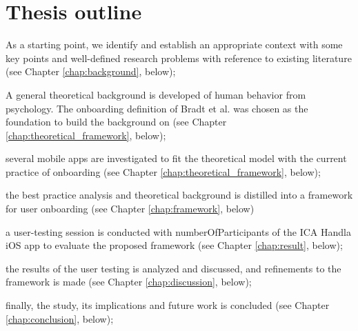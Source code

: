 \section{Thesis outline}
\begin{enumerate*}[label=(\(\arabic*\))]
  \item As a starting point, we identify and establish an appropriate context with some key points and well-defined research problems with reference to existing literature (see Chapter \ref{chap:background}, below);
  \item A general theoretical background is developed of human behavior from psychology. The onboarding definition of Bradt et al. \cite{Bradt2009} was chosen as the foundation to build the background on (see Chapter \ref{chap:theoretical_framework}, below);
  \item several mobile apps are investigated to fit the theoretical model with the current practice of onboarding (see Chapter \ref{chap:theoretical_framework}, below);
  \item the best practice analysis and theoretical background is distilled into a framework for user onboarding (see Chapter \ref{chap:framework}, below)
  \item a user-testing session is conducted with numberOfParticipants of the ICA Handla iOS app to evaluate the proposed framework (see Chapter \ref{chap:result}, below);
  \item the results of the user testing is analyzed and discussed, and refinements to the framework is made (see Chapter \ref{chap:discussion}, below);
  \item finally, the study, its implications and future work is concluded (see Chapter \ref{chap:conclusion}, below); 
\end{enumerate*}

